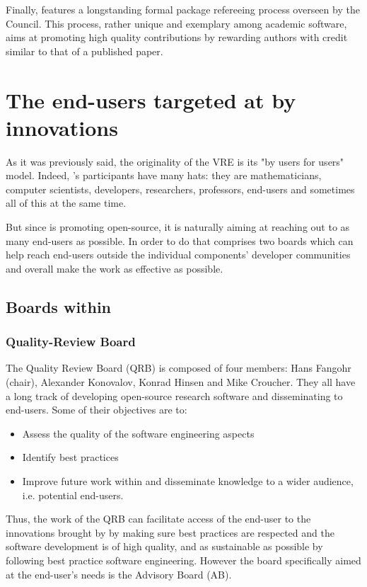 \documentclass{deliverablereport}
\begin{document}
Finally, \GAP features a longstanding formal package refereeing process
overseen by the \GAP Council. This process, rather unique and exemplary
among academic software, aims at promoting high quality contributions
by rewarding authors with credit similar to that of a published paper.

\section{The end-users targeted at by innovations}

As it was previously said, the originality of the \ODK VRE is its "by users for
users" model. Indeed, \ODK's participants have many hats: they are
mathematicians, computer scientists, developers, researchers, professors,
end-users and sometimes all of this at the same time.

But since \ODK is promoting open-source, it is naturally aiming at reaching out
to as many end-users as possible. In order to do that \ODK comprises two boards
which can help reach end-users outside the individual components' developer
communities and overall make the \ODK work as effective as possible.

\subsection{Boards within \ODK}

\subsubsection{Quality-Review Board}

The Quality Review Board (QRB) is composed of four members: Hans
Fangohr (chair), Alexander Konovalov, Konrad Hinsen and Mike
Croucher. They all have a long track of developing open-source research
software and disseminating to end-users. Some of their objectives are
to:

\begin{itemize}
\item{Assess the quality of the software engineering aspects}
\item{Identify best practices}
\item{Improve future work within \ODK and disseminate knowledge to a wider audience, i.e. potential end-users.}
\end{itemize}

Thus, the work of the QRB can facilitate access of the end-user to the
innovations brought by \ODK by making sure best practices are
respected and the software development is of high quality, and as
sustainable as possible by following best practice software
engineering.
However the
board specifically aimed at the end-user's needs is the Advisory
Board (AB).
\end{document}
